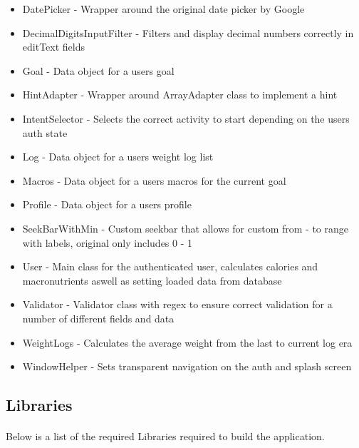 \documentclass{article}
\begin{document}
        \begin{itemize}
            \item DatePicker                 - Wrapper around the original date picker by Google
            \item DecimalDigitsInputFilter   - Filters and display decimal numbers correctly in editText fields
            \item Goal                       - Data object for a users goal
            \item HintAdapter                - Wrapper around ArrayAdapter class to implement a hint
            \item IntentSelector             - Selects the correct activity to start depending on the users auth state
            \item Log                        - Data object for a users weight log list
            \item Macros                     - Data object for a users macros for the current goal
            \item Profile                    - Data object for a users profile
            \item SeekBarWithMin             - Custom seekbar that allows for custom from - to range with labels, original only includes 0 - 1
            \item User                       - Main class for the authenticated user, calculates calories and macronutrients aswell as setting loaded data from database
            \item Validator                  - Validator class with regex to ensure correct validation for a number of different fields and data
            \item WeightLogs                 - Calculates the average weight from the last to current log era
            \item WindowHelper               - Sets transparent navigation on the auth and splash screen
        \end{itemize}

        \hfill \break

    \subsection{Libraries}
        \paragraph{}
        Below is a list of the required Libraries required to build the application.
\end{document}

